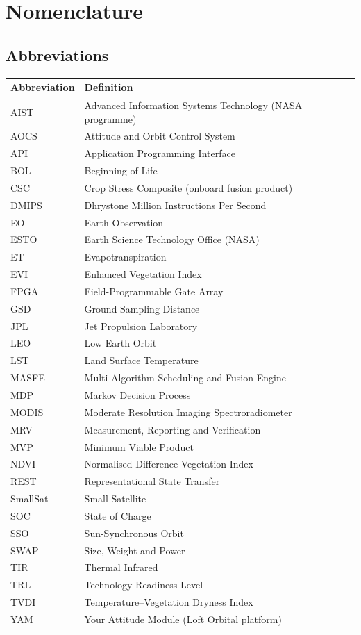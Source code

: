 \chapter*{Nomenclature}

\section*{Abbreviations}

\begin{longtable}{p{2.8cm}p{10cm}}
  \toprule
  Abbreviation & Definition \\
  \midrule\endhead
  AIST   & Advanced Information Systems Technology (NASA programme) \\
  AOCS   & Attitude and Orbit Control System \\
  API    & Application Programming Interface \\
  BOL    & Beginning of Life \\
  CSC    & Crop Stress Composite (onboard fusion product) \\
  DMIPS  & Dhrystone Million Instructions Per Second \\
  EO     & Earth Observation \\
  ESTO   & Earth Science Technology Office (NASA) \\
  ET     & Evapotranspiration \\
  EVI    & Enhanced Vegetation Index \\
  FPGA   & Field-Programmable Gate Array \\
  GSD    & Ground Sampling Distance \\
  JPL    & Jet Propulsion Laboratory \\
  LEO    & Low Earth Orbit \\
  LST    & Land Surface Temperature \\
  MASFE  & Multi-Algorithm Scheduling and Fusion Engine \\
  MDP    & Markov Decision Process \\
  MODIS  & Moderate Resolution Imaging Spectroradiometer \\
  MRV    & Measurement, Reporting and Verification \\
  MVP    & Minimum Viable Product \\
  NDVI   & Normalised Difference Vegetation Index \\
  REST   & Representational State Transfer \\
  SmallSat & Small Satellite \\
  SOC    & State of Charge \\
  SSO    & Sun-Synchronous Orbit \\
  SWAP   & Size, Weight and Power \\
  TIR    & Thermal Infrared \\
  TRL    & Technology Readiness Level \\
  TVDI   & Temperature--Vegetation Dryness Index \\
  YAM    & Your Attitude Module (Loft Orbital platform) \\
  \bottomrule
\end{longtable}

